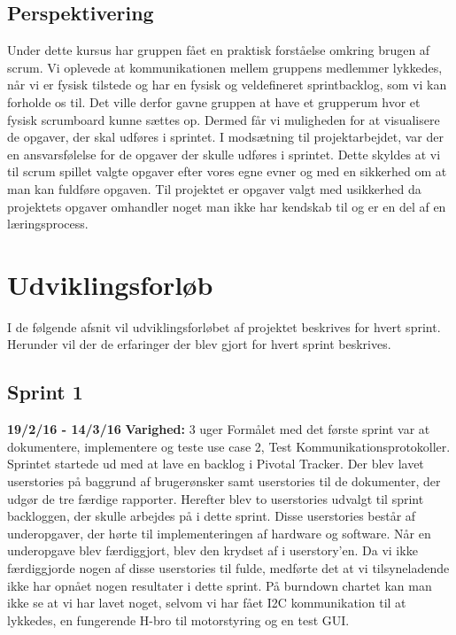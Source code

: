 \subsection{Perspektivering}
Under dette kursus har gruppen fået en praktisk forståelse omkring brugen af scrum. Vi oplevede at kommunikationen mellem gruppens medlemmer lykkedes, når vi er fysisk tilstede og har en fysisk og veldefineret sprintbacklog, som vi kan forholde os til. Det ville derfor gavne gruppen at have et grupperum hvor et fysisk scrumboard kunne sættes op. Dermed får vi muligheden for at visualisere de opgaver, der skal udføres i sprintet. \newline
I modsætning til projektarbejdet, var der en ansvarsfølelse for de opgaver der skulle udføres i sprintet. Dette skyldes at vi til scrum spillet valgte opgaver efter vores egne evner og med en sikkerhed om at man kan fuldføre opgaven. Til projektet er opgaver valgt med usikkerhed da projektets opgaver omhandler noget man ikke har kendskab til og er en del af en læringsprocess.

\section{Udviklingsforløb}
I de følgende afsnit vil udviklingsforløbet af projektet beskrives for hvert sprint. Herunder vil der de erfaringer der blev gjort for hvert sprint beskrives.
	\subsection{Sprint 1}
	\textbf{19/2/16 - 14/3/16}\newline
	\textbf{Varighed:} 3 uger\newline
	Formålet med det første sprint var at dokumentere, implementere og teste use case 2, Test Kommunikationsprotokoller.
	Sprintet startede ud med at lave en backlog i Pivotal Tracker. Der blev lavet userstories på baggrund af brugerønsker samt userstories til de dokumenter, der udgør de tre færdige rapporter. Herefter blev to userstories udvalgt til sprint backloggen, der skulle arbejdes på i dette sprint. Disse userstories består af underopgaver, der hørte til implementeringen af hardware og software. Når en underopgave blev færdiggjort, blev den krydset af i userstory'en. Da vi ikke færdiggjorde nogen af disse userstories til fulde, medførte det at vi tilsyneladende ikke har opnået nogen resultater i dette sprint. På burndown chartet kan man ikke se at vi har lavet noget, selvom vi har fået I2C kommunikation til at lykkedes, en fungerende H-bro til motorstyring og en test GUI. \newline
	
